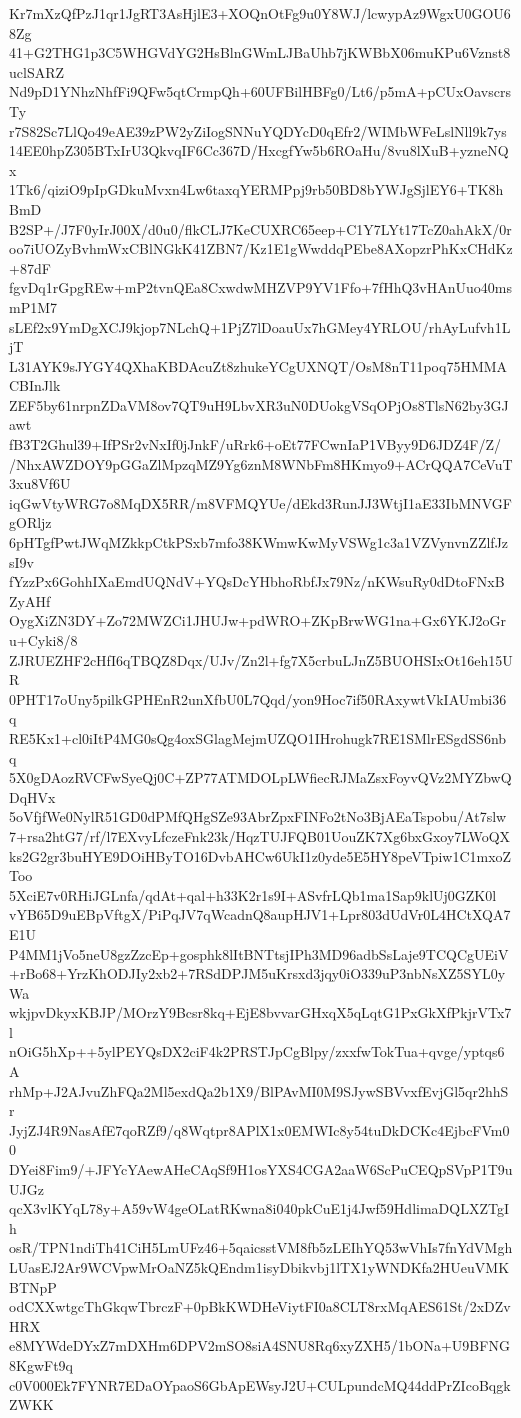 Kr7mXzQfPzJ1qr1JgRT3AsHjlE3+XOQnOtFg9u0Y8WJ/lcwypAz9WgxU0GOU68Zg
41+G2THG1p3C5WHGVdYG2HsBlnGWmLJBaUhb7jKWBbX06muKPu6Vznst8uclSARZ
Nd9pD1YNhzNhfFi9QFw5qtCrmpQh+60UFBilHBFg0/Lt6/p5mA+pCUxOavscrsTy
r7S82Sc7LlQo49eAE39zPW2yZiIogSNNuYQDYcD0qEfr2/WIMbWFeLslNll9k7ys
14EE0hpZ305BTxIrU3QkvqIF6Cc367D/HxcgfYw5b6ROaHu/8vu8lXuB+yzneNQx
1Tk6/qiziO9pIpGDkuMvxn4Lw6taxqYERMPpj9rb50BD8bYWJgSjlEY6+TK8hBmD
B2SP+/J7F0yIrJ00X/d0u0/flkCLJ7KeCUXRC65eep+C1Y7LYt17TcZ0ahAkX/0r
oo7iUOZyBvhmWxCBlNGkK41ZBN7/Kz1E1gWwddqPEbe8AXopzrPhKxCHdKz+87dF
fgvDq1rGpgREw+mP2tvnQEa8CxwdwMHZVP9YV1Ffo+7fHhQ3vHAnUuo40msmP1M7
sLEf2x9YmDgXCJ9kjop7NLchQ+1PjZ7lDoauUx7hGMey4YRLOU/rhAyLufvh1LjT
L31AYK9sJYGY4QXhaKBDAcuZt8zhukeYCgUXNQT/OsM8nT11poq75HMMACBInJlk
ZEF5by61nrpnZDaVM8ov7QT9uH9LbvXR3uN0DUokgVSqOPjOs8TlsN62by3GJawt
fB3T2Ghul39+IfPSr2vNxIf0jJnkF/uRrk6+oEt77FCwnIaP1VByy9D6JDZ4F/Z/
/NhxAWZDOY9pGGaZlMpzqMZ9Yg6znM8WNbFm8HKmyo9+ACrQQA7CeVuT3xu8Vf6U
iqGwVtyWRG7o8MqDX5RR/m8VFMQYUe/dEkd3RunJJ3WtjI1aE33IbMNVGFgORljz
6pHTgfPwtJWqMZkkpCtkPSxb7mfo38KWmwKwMyVSWg1c3a1VZVynvnZZlfJzsI9v
fYzzPx6GohhIXaEmdUQNdV+YQsDcYHbhoRbfJx79Nz/nKWsuRy0dDtoFNxBZyAHf
OygXiZN3DY+Zo72MWZCi1JHUJw+pdWRO+ZKpBrwWG1na+Gx6YKJ2oGru+Cyki8/8
ZJRUEZHF2cHfI6qTBQZ8Dqx/UJv/Zn2l+fg7X5crbuLJnZ5BUOHSIxOt16eh15UR
0PHT17oUny5pilkGPHEnR2unXfbU0L7Qqd/yon9Hoc7if50RAxywtVkIAUmbi36q
RE5Kx1+cl0iItP4MG0sQg4oxSGlagMejmUZQO1IHrohugk7RE1SMlrESgdSS6nbq
5X0gDAozRVCFwSyeQj0C+ZP77ATMDOLpLWfiecRJMaZsxFoyvQVz2MYZbwQDqHVx
5oVfjfWe0NylR51GD0dPMfQHgSZe93AbrZpxFINFo2tNo3BjAEaTspobu/At7slw
7+rsa2htG7/rf/l7EXvyLfczeFnk23k/HqzTUJFQB01UouZK7Xg6bxGxoy7LWoQX
ks2G2gr3buHYE9DOiHByTO16DvbAHCw6UkI1z0yde5E5HY8peVTpiw1C1mxoZToo
5XciE7v0RHiJGLnfa/qdAt+qal+h33K2r1s9I+ASvfrLQb1ma1Sap9klUj0GZK0l
vYB65D9uEBpVftgX/PiPqJV7qWcadnQ8aupHJV1+Lpr803dUdVr0L4HCtXQA7E1U
P4MM1jVo5neU8gzZzcEp+gosphk8lItBNTtsjIPh3MD96adbSsLaje9TCQCgUEiV
+rBo68+YrzKhODJIy2xb2+7RSdDPJM5uKrsxd3jqy0iO339uP3nbNsXZ5SYL0yWa
wkjpvDkyxKBJP/MOrzY9Bcsr8kq+EjE8bvvarGHxqX5qLqtG1PxGkXfPkjrVTx7l
nOiG5hXp++5ylPEYQsDX2ciF4k2PRSTJpCgBlpy/zxxfwTokTua+qvge/yptqs6A
rhMp+J2AJvuZhFQa2Ml5exdQa2b1X9/BlPAvMI0M9SJywSBVvxfEvjGl5qr2hhSr
JyjZJ4R9NasAfE7qoRZf9/q8Wqtpr8APlX1x0EMWIc8y54tuDkDCKc4EjbcFVm00
DYei8Fim9/+JFYcYAewAHeCAqSf9H1osYXS4CGA2aaW6ScPuCEQpSVpP1T9uUJGz
qcX3vlKYqL78y+A59vW4geOLatRKwna8i040pkCuE1j4Jwf59HdlimaDQLXZTgIh
osR/TPN1ndiTh41CiH5LmUFz46+5qaicsstVM8fb5zLEIhYQ53wVhIs7fnYdVMgh
LUasEJ2Ar9WCVpwMrOaNZ5kQEndm1isyDbikvbj1lTX1yWNDKfa2HUeuVMKBTNpP
odCXXwtgcThGkqwTbrczF+0pBkKWDHeViytFI0a8CLT8rxMqAES61St/2xDZvHRX
e8MYWdeDYxZ7mDXHm6DPV2mSO8siA4SNU8Rq6xyZXH5/1bONa+U9BFNG8KgwFt9q
c0V000Ek7FYNR7EDaOYpaoS6GbApEWsyJ2U+CULpundcMQ44ddPrZIcoBqgkZWKK
